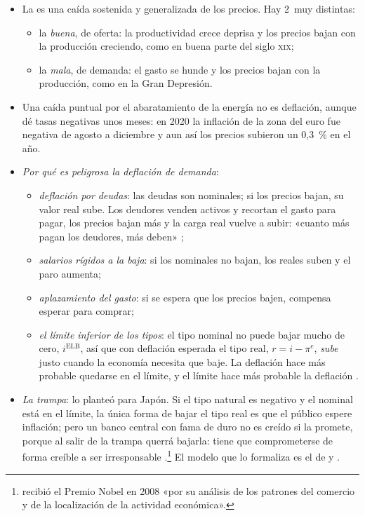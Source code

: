 \documentclass[11pt]{article}
\begin{document}
\begin{itemize}
\item La  es una caída sostenida y generalizada de los precios. Hay 2~muy distintas\nocite{BordoFilardo2005Deflacion}:
  \begin{itemize}
  \item la \emph{buena}, de oferta: la productividad crece deprisa y los precios bajan con la producción creciendo, como en buena parte del siglo \textsc{xix};
  \item la \emph{mala}, de demanda: el gasto se hunde y los precios bajan con la producción, como en la Gran Depresión.
  \end{itemize}
\item Una caída puntual por el abaratamiento de la energía no es deflación, aunque dé tasas negativas unos meses: en 2020 la inflación de la zona del euro fue negativa de agosto a diciembre y aun así los precios subieron un 0,3~\% en el año\nocite{Eurostat2026IAPC}.
\item \emph{Por qué es peligrosa la deflación de demanda}:
  \begin{itemize}
  \item \emph{deflación por deudas}: las deudas son nominales; si los precios bajan, su valor real sube. Los deudores venden activos y recortan el gasto para pagar, los precios bajan más y la carga real vuelve a subir: «cuanto más pagan los deudores, más deben»\nocite{Fisher1933} ;
  \item \emph{salarios rígidos a la baja}: si los nominales no bajan, los reales suben y el paro aumenta;
  \item \emph{aplazamiento del gasto}: si se espera que los precios bajen, compensa esperar para comprar;
  \item \emph{el límite inferior de los tipos}: el tipo nominal no puede bajar mucho de cero, $i^{\mathrm{ELB}}$, así que con deflación esperada el tipo real, $r=i-\pi^e$, \emph{sube} justo cuando la economía necesita que baje. La deflación hace más probable quedarse en el límite, y el límite hace más probable la deflación .
  \end{itemize}
\item \emph{La trampa}: \textcite{Krugman1998Baaack} lo planteó para Japón. Si el tipo natural es negativo y el nominal está en el límite, la única forma de bajar el tipo real es que el público espere inflación; pero un banco central con fama de duro no es creído si la promete, porque al salir de la trampa querrá bajarla: tiene que comprometerse de forma creíble a ser irresponsable .\footnote{ recibió el Premio Nobel en 2008 «por su análisis de los patrones del comercio y de la localización de la actividad económica»\nocite{Nobel2008Krugman}.} El modelo que lo formaliza es el de  y .
\end{itemize}
\end{document}
